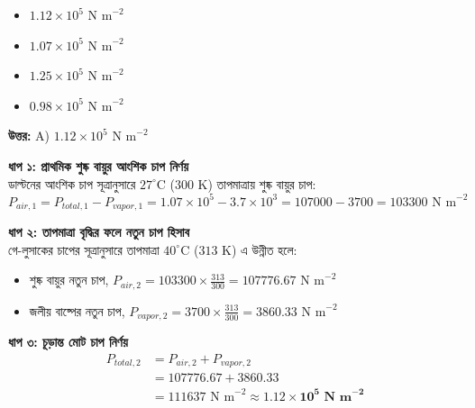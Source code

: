 \documentclass[12pt, a4paper]{article}
\begin{document}
\begin{itemize}[label={}, leftmargin=1cm, itemsep=0.5em]
    \item[\textbf{A)}] $1.12 \times 10^5\text{ N m}^{-2}$
    \item[\textbf{B)}] $1.07 \times 10^5\text{ N m}^{-2}$
    \item[\textbf{C)}] $1.25 \times 10^5\text{ N m}^{-2}$
    \item[\textbf{D)}] $0.98 \times 10^5\text{ N m}^{-2}$
\end{itemize}

\vspace{0.5em}
\begin{tcolorbox}[answerbox]
    \textbf{\color{success} উত্তর:} A) $1.12 \times 10^5\text{ N m}^{-2}$
\end{tcolorbox}
\vspace{1em}

\begin{tcolorbox}[solutionbox={সমাধান (Solution)}]
    \noindent
    \textbf{ধাপ ১: প্রাথমিক শুষ্ক বায়ুর আংশিক চাপ নির্ণয়} \\
    ডাল্টনের আংশিক চাপ সূত্রানুসারে $27^\circ\text{C}$ ($300\text{ K}$) তাপমাত্রায় শুষ্ক বায়ুর চাপ:
    \[ P_{air,1} = P_{total,1} - P_{vapor,1} = 1.07 \times 10^5 - 3.7 \times 10^3 = 107000 - 3700 = 103300\text{ N m}^{-2} \]
    
    \vspace{0.4em}
    \noindent\textbf{ধাপ ২: তাপমাত্রা বৃদ্ধির ফলে নতুন চাপ হিসাব} \\
    গে-লুসাকের চাপের সূত্রানুসারে তাপমাত্রা $40^\circ\text{C}$ ($313\text{ K}$) এ উন্নীত হলে:
    \begin{itemize}[leftmargin=1.5em, itemsep=0.2em]
        \item শুষ্ক বায়ুর নতুন চাপ, $P_{air,2} = 103300 \times \frac{313}{300} = 107776.67\text{ N m}^{-2}$
        \item জলীয় বাষ্পের নতুন চাপ, $P_{vapor,2} = 3700 \times \frac{313}{300} = 3860.33\text{ N m}^{-2}$
    \end{itemize}
    
    \vspace{0.4em}
    \noindent\textbf{ধাপ ৩: চূড়ান্ত মোট চাপ নির্ণয়}
    \begin{align*}
        P_{total,2} &= P_{air,2} + P_{vapor,2} \\
        &= 107776.67 + 3860.33 \\
        &= 111637\text{ N m}^{-2} \approx \mathbf{1.12 \times 10^5\text{ N m}^{-2}}
    \end{align*}
\end{tcolorbox}
\end{document}
